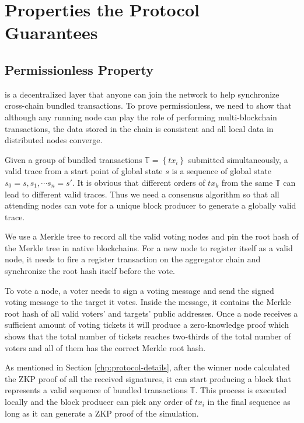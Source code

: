 \section {Properties the Protocol Guarantees}
\label{chp:properities}

\subsection{Permissionless Property}
\dprotocol is a decentralized layer that anyone can join the network to help synchronize cross-chain bundled transactions. To prove permissionless, we need to show that although any running node can play the role of performing multi-blockchain transactions, the data stored in the chain is consistent and all local data in distributed nodes converge.

Given a group of bundled transactions $\mathbb{T} = \left\{tx_i\right\}$ submitted simultaneously, a valid trace from a start point of global state $s$ is a sequence of global state $s_0=s, s_1, \cdots s_n = s'$. It is obvious that different orders of $tx_k$ from the same $\mathbb{T}$ can lead to different valid traces. Thus we need a consensus algorithm so that all attending nodes can vote for a unique block producer to generate a globally valid trace.

We use a Merkle tree to record all the valid voting nodes and pin the root hash of the Merkle tree in native blockchains. For a new node to register itself as a valid node, it needs to fire a register transaction on the aggregator chain and synchronize the root hash itself before the vote.

To vote a node, a voter needs to sign a voting message and send the signed voting message to the target it votes. Inside the message, it contains the Merkle root hash of all valid voters' and targets' public addresses. Once a node receives a sufficient amount of voting tickets it will produce a zero-knowledge proof which shows that the total number of tickets reaches two-thirds of the total number of voters and all of them has the correct Merkle root hash. 

As mentioned in Section \ref{chp:protocol-details}, after the winner node calculated the ZKP proof of all the received signatures, it can start producing a block that represents a valid sequence of bundled transactions $\mathbb{T}$. This process is executed locally and the block producer can pick any order of $tx_i$ in the final sequence as long as it can generate a ZKP proof of the simulation.

